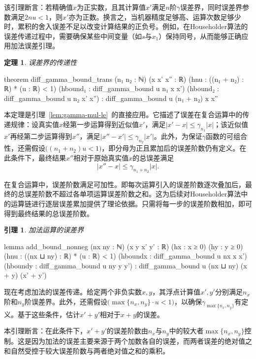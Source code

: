 ﻿\documentclass[UTF8,a4paper,openany]{ctexbook}
\theoremstyle{qrplain}
\newtheorem{theorem}[definition]{定理}
\newtheorem{lemma}[definition]{引理}
{}
\begin{document}
该引理断言：若精确值$x$为正实数，且其计算值$x'$满足$n$阶$\gamma$误差界，同时误差界参数满足$2nu<1$，则$x'$亦为正数。换言之，当机器精度足够高、运算次数足够少时，累积的舍入误差不足以改变计算结果的正负号。例如，在Householder算法的误差传递过程中，需要确保某些中间变量（如$s$与$x_1$）保持同号，从而能够正确应用加法误差引理。

\begin{theorem}
\label{thm:diff-gamma-bound-trans}
  误差界的传递性
\end{theorem}
\begin{leancode}
  theorem diff_gamma_bound_trans (n₁ n₂ : ℕ) (x x' x'' : ℝ) 
    (hnu : ((n₁ + n₂) : ℝ) * (u : ℝ) < 1) 
    (hbound₁ : diff_gamma_bound u n₁ x x') 
    (hbound₂ : diff_gamma_bound u n₂ x' x'') :
      diff_gamma_bound u (n₁ + n₂) x x'' 
\end{leancode}

本定理是引理~\ref{lem:gamma-mul-le}~的直接应用。它描述了误差在复合运算中的传递规律：设真实值$x$经第一步运算得到近似值$x'$，满足$|x'-x|\le\gamma_{n_1}|x|$；该近似值$x'$再经第二步运算得到$x''$，满足$|x''-x'|\le\gamma_{n_2}|x'|$。此外，为保证$\gamma$函数的可组合性，还需假设$\bigl((n_1+n_2)u<1\bigr)$，即分母为正且累加后的误差阶数仍有定义。在此条件下，最终结果$x''$相对于原始真实值$x$的总误差满足
$$
|x''-x|\le\gamma_{n_1+n_2}|x|.
$$

在复合运算中，误差阶数满足可加性。即每次运算引入的误差阶数逐次叠加后，最终的总误差阶数不超过各单项运算误差阶数之和。这为后续对Householder算法中的运算链进行逐层误差累加提供了理论依据。只需将每一步的误差阶数相加，即可得到最终结果的总误差阶数。

\begin{lemma}
\label{lem:add-bound-nonneg}
  加法运算的误差界
\end{lemma}
\begin{leancode}
  lemma add_bound_nonneg
    (nx ny : ℕ) (x y x' y' : ℝ)
    (hx : x ≥ 0) (hy : y ≥ 0)
    (hnu : ((nx ⊔ ny) : ℝ) * (u : ℝ) < 1)
    (hboundx : diff_gamma_bound u nx x x')
    (hboundy : diff_gamma_bound u ny y y') :
      diff_gamma_bound u (nx ⊔ ny) (x + y) (x' + y')
\end{leancode}

现在考虑加法的误差传递。给定两个非负实数$x,y$，其浮点计算值$x',y'$分别满足$n_x$阶和$n_y$阶误差界。此外，还需假设$\bigl(\max\{n_x,n_y\}\cdot u<1\bigr)$，以确保$\gamma_{\max\{n_x,n_y\}}$有定义。基于这些条件，估计$x'+y'$相对于$x+y$的误差。

本引理断言：在此条件下，$x'+y'$的误差阶数由$n_x$与$n_y$中的较大者$\max\{n_x,n_y\}$控制。这是因为加法的误差主要来源于两个加数各自的误差，而两者误差的绝对值之和自然受控于较大误差阶数与两者绝对值之和的乘积。
\end{document}
